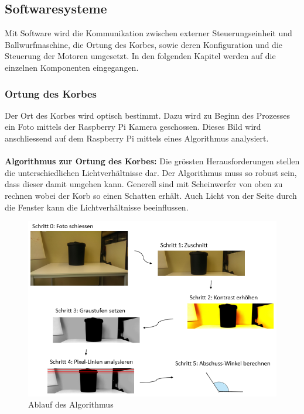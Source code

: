 \subsection{Softwaresysteme}
Mit Software wird die Kommunikation zwischen externer Steuerungseinheit und Ballwurfmaschine, die Ortung des Korbes, sowie deren Konfiguration und die Steuerung der Motoren umgesetzt. In den folgenden Kapitel werden auf die einzelnen Komponenten eingegangen.

\subsubsection{Ortung des Korbes}
Der Ort des Korbes wird optisch bestimmt. Dazu wird zu Beginn des Prozesses ein Foto mittels der Raspberry Pi Kamera geschossen. Dieses Bild wird anschliessend auf dem Raspberry Pi mittels eines Algorithmus analysiert.\\
\\
\textbf{Algorithmus zur Ortung des Korbes:}
\label{abb-algorithmus-zur-ortung-des-korbes}
Die grössten Herausforderungen stellen die unterschiedlichen Lichtverhältnisse dar. Der Algorithmus muss so robust sein, dass dieser damit umgehen kann. Generell sind mit Scheinwerfer von oben zu rechnen wobei der Korb so einen Schatten erhält. Auch Licht von der Seite durch die Fenster kann die Lichtverhältnisse beeinflussen.

\begin{figure}[h!]
	\centering
	\includegraphics[scale=0.75]{../../fig/ablauf-ortung-des-korbes-algorithmus.png}
	\caption{Ablauf des Algorithmus}
\end{figure}

